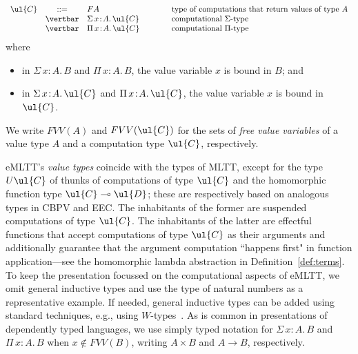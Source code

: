 \begin{definition}
\[\begin{array}{r c l @{\qquad\qquad}l}
\index{ FA@$FA$ (type of computations that return values of type $A$)}
\ul{C} & ::= & FA & \text{type of computations that return values of type $A$}
\\
\index{ Sigma@$\Sigma \, x \hspace{-0.05cm}:\hspace{-0.05cm} A .\, \ul{C}$ (computational $\Sigma$-type)}
& \vertbar & \Sigma \, x \!:\! A .\, \ul{C} & \text{computational $\Sigma$-type}
\\
\index{ Product@$\Pi \, x \hspace{-0.05cm}:\hspace{-0.05cm} A .\, \ul{C}$ (computational $\Pi$-type)}
& \vertbar & \Pi \, x \!:\! A .\, \ul{C} & \text{computational $\Pi$-type}
\end{array}
\vspace{0.2cm}
\]
where 
\begin{itemize}
\item in $\Sigma \, x \!:\! A .\, B$ and $\Pi \, x \!:\! A .\, B$, the value variable $x$ is bound in $B$; and
\item in $\Sigma \, x \!:\! A .\, \ul{C}$ and $\Pi \, x \!:\! A .\, \ul{C}$, the value variable $x$ is bound in $\ul{C}$.
\end{itemize}
\end{definition}

We write $FVV(A)$ and $FVV(\ul{C})$ for the sets of \emph{free value variables} of a value type $A$ and a computation type $\ul{C}$, respectively.


eMLTT's \emph{value types} coincide with the types of MLTT, except for the type $U\ul{C}$ of thunks of computations of type $\ul{C}$ and the homomorphic function type $\ul{C} \multimap \ul{D}$; these are respectively based on analogous types in CBPV and EEC. The inhabitants of the former are suspended computations of type $\ul{C}$. The inhabitants of the latter are effectful functions that accept computations of type $\ul{C}$ as their arguments and additionally guarantee that the argument computation ``happens first" in function application---see the homomorphic lambda abstraction in Definition~\ref{def:terms}. 
%
To keep the presentation focussed on the computational aspects of eMLTT, we omit general inductive types and use the type of natural numbers as a representative example. If needed, general inductive types can be added using standard techniques, e.g., using $W$\!-types~\cite{MartinLof:Bibliopolis}. 
%
As is common in presentations of dependently typed languages, we use simply typed notation for $\Sigma\, x \!:\! A .\, B$ and $\Pi\, x \!:\! A .\, B$ when $x \not\in FVV(B)$, writing $A \times B$ and $A \to B$, respectively. 


